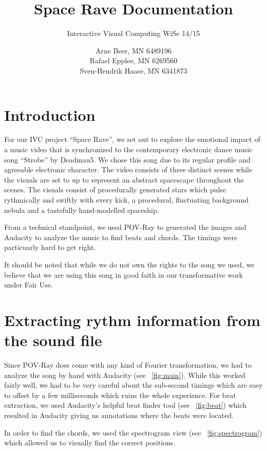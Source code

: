 \documentclass[a4paper, 12pt]{scrartcl}
\title{Space Rave Documentation}
\subtitle{Interactive Visual Computing WiSe 14/15}
\author{Arne Beer, MN 6489196\\
        Rafael Epplee, MN 6269560\\
        Sven-Hendrik Haase, MN 6341873}
\begin{document}
\maketitle \section{Introduction}

    For our IVC project ``Space Rave'', we set out to explore the emotional impact of a music video
    that is synchronized to the contemporary electronic dance music song ``Strobe'' by Deadmau5. We
    chose this song due to its regular profile and agreeable electronic character.  The video
    consists of three distinct scenes while the visuals are set to up to represent an abstract
    spacescape throughout the scenes. The visuals consist of procedurally generated stars which
    pulse rythmically and swiftly with every kick, a procedural, fluctuating background nebula and
    a tastefully hand-modelled spaceship.

    From a technical standpoint, we used POV-Ray to generated the images and Audacity to analyze
    the music to find beats and chords. The timings were particuarly hard to get right.

    It should be noted that while we do not own the rights to the song we used, we believe that we
    are using this song in good faith in our transformative work under Fair Use.

    \section{Extracting rythm information from the sound file}

    Since POV-Ray does come with any kind of Fourier transformation, we had to analyze the song by
    hand with Audacity (see ~\ref{fig:main}). While this worked fairly well, we had to be very
    careful about the sub-second timings which are easy to offset by a few milliseconds which ruins
    the whole experience. For beat extraction, we used Audacity's helpful beat finder tool (see
    ~\ref{fig:beat}) which resulted in Audacity giving us annotations where the beats were located.

    In order to find the chords, we used the spectrogram view (see ~\ref{fig:spectrogram}) which
    allowed us to visually find the correct positions.
\end{document}
